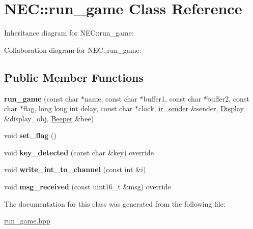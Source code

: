 \hypertarget{classNEC_1_1run__game}{}\section{N\+EC\+:\+:run\+\_\+game Class Reference}
\label{classNEC_1_1run__game}


Inheritance diagram for N\+EC\+:\+:run\+\_\+game\+:


Collaboration diagram for N\+EC\+:\+:run\+\_\+game\+:
\subsection*{Public Member Functions}
\begin{DoxyCompactItemize}
\item 
\mbox{\label{classNEC_1_1run__game_a379697e5f2a8b18032761846694d5524}} 
{\bfseries run\+\_\+game} (const char $\ast$name, const char $\ast$buffer1, const char $\ast$buffer2, const char $\ast$flag, long long int delay, const char $\ast$clock, \hyperlink{classir__sender}{ir\+\_\+sender} \&sender, \hyperlink{classNEC_1_1Display}{Display} \&display\+\_\+obj, \hyperlink{classNEC_1_1Beeper}{Beeper} \&bee)
\item 
\mbox{\label{classNEC_1_1run__game_a106ffb6efd112c59146db061740d7dc9}} 
void {\bfseries set\+\_\+flag} ()
\item 
\mbox{\label{classNEC_1_1run__game_a80a2ebe199ff755a38e84c35ae4334bc}} 
void {\bfseries key\+\_\+detected} (const char \&key) override
\item 
\mbox{\label{classNEC_1_1run__game_a316d562251faf82dc867bbff74627d9d}} 
void {\bfseries write\+\_\+int\+\_\+to\+\_\+channel} (const int \&i)
\item 
\mbox{\label{classNEC_1_1run__game_a038a2008be65ffca162af36102805c1a}} 
void {\bfseries msg\+\_\+received} (const uint16\+\_\+t \&msg) override
\end{DoxyCompactItemize}


The documentation for this class was generated from the following file\+:\begin{DoxyCompactItemize}
\item 
\hyperlink{run__game_8hpp}{run\+\_\+game.\+hpp}\end{DoxyCompactItemize}
